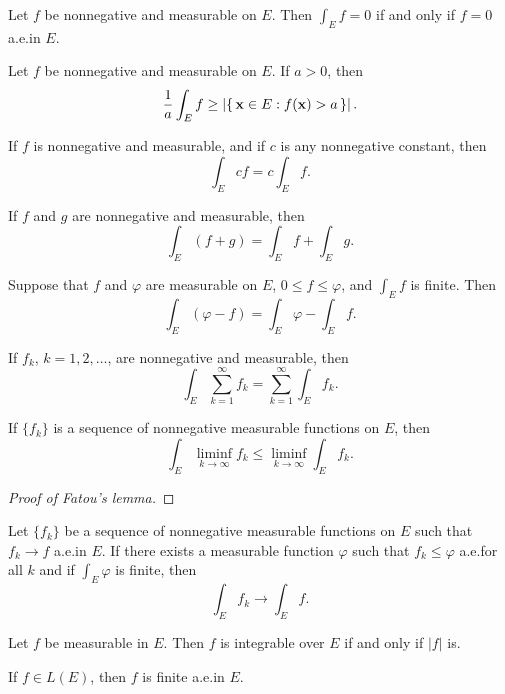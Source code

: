 \begin{theorem*}[5.11]
Let $f$ be nonnegative and measurable on $E$. Then $\int_E f=0$ if and only
if $f=0$ a.e.\@ in $E$.
\end{theorem*}
\begin{corollary*}
Let $f$ be nonnegative and measurable on $E$. If $a>0$, then
\[
\frac{1}{a}\int_E f\geq\left|\left\{\,\mathbf{x}\in E:f(\mathbf{x})>a\,\right\}\right|.
\]
\end{corollary*}
\begin{theorem*}[5.13]
If $f$ is nonnegative and measurable, and if $c$ is any nonnegative
constant, then
\[
\int_E cf=c\int_E f.
\]
\end{theorem*}
\begin{theorem*}[5.14]
If $f$ and $g$ are nonnegative and measurable, then
\[
\int_E (f+g)=\int_E f+\int_E g.
\]
\end{theorem*}
\begin{corollary*}
Suppose that $f$ and $\varphi$ are measurable on $E$, $0\leq f\leq\varphi$,
and $\int_E f$ is finite. Then
\[
\int_E (\varphi-f)=\int_E\varphi-\int_E f.
\]
\end{corollary*}
\begin{theorem*}[5.16]
If $f_k$, $k=1,2,\dotsc$, are nonnegative and measurable, then
\[
\int_E\sum_{k=1}^\infty f_k=\sum_{k=1}^\infty\int_E f_k.
\]
\end{theorem*}
\begin{theorem*}
If $\{f_k\}$ is a sequence of nonnegative measurable functions on $E$, then
\[
  \int_E\liminf_{k\to\infty} f_k\leq\liminf_{k\to\infty}\int_E f_k.
\]
\end{theorem*}
\begin{proof}[Proof of Fatou's lemma]
\end{proof}
\begin{theorem*}
Let $\{f_k\}$ be a sequence of nonnegative measurable functions on $E$ such
that $f_k\to f$ a.e.\@ in $E$. If there exists a measurable function
$\varphi$ such that $f_k\leq\varphi$ a.e.\@ for all $k$ and if
$\int_E\varphi$ is finite, then
\[
\int_E f_k\longrightarrow\int_E f.
\]
\end{theorem*}
\begin{theorem*}[5.21]
Let $f$ be measurable in $E$. Then $f$ is integrable over $E$ if and only
if $|f|$ is.
\end{theorem*}
\begin{theorem*}[5.22]
If $f\in L(E)$, then $f$ is finite a.e.\@ in $E$.
\end{theorem*}
